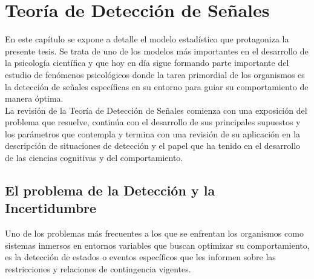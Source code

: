 \chapter{Teoría de Detección de Señales} %

\label{Cap_SDT} %


\newcommand{\keyword}[1]{\textbf{#1}}
\newcommand{\tabhead}[1]{\textbf{#1}}
\newcommand{\code}[1]{\texttt{#1}}
\newcommand{\file}[1]{\texttt{\bfseries#1}}
\newcommand{\option}[1]{\texttt{\itshape#1}}


En este capítulo se expone a detalle el modelo estadístico que protagoniza la presente tesis. Se trata de uno de los modelos más importantes en el desarrollo de la psicología científica y que hoy en día sigue formando parte importante del estudio de fenómenos psicológicos donde la tarea primordial de los organismos es la detección de señales específicas en su entorno para guiar su comportamiento de manera óptima.\\

La revisión de la Teoría de Detección de Señales comienza con una exposición del problema que resuelve, continúa con el desarrollo de sus principales supuestos y los parámetros que contempla y termina con una revisión de su aplicación en la descripción de situaciones de detección y el papel que ha tenido en el desarrollo de las ciencias cognitivas y del comportamiento.\\

\section{El problema de la Detección y la Incertidumbre}

Uno de los problemas más frecuentes a los que se enfrentan los organismos como sistemas inmersos en entornos variables que buscan optimizar su comportamiento, es la detección de estados o eventos específicos que les informen sobre las restricciones y relaciones de contingencia vigentes.\\

